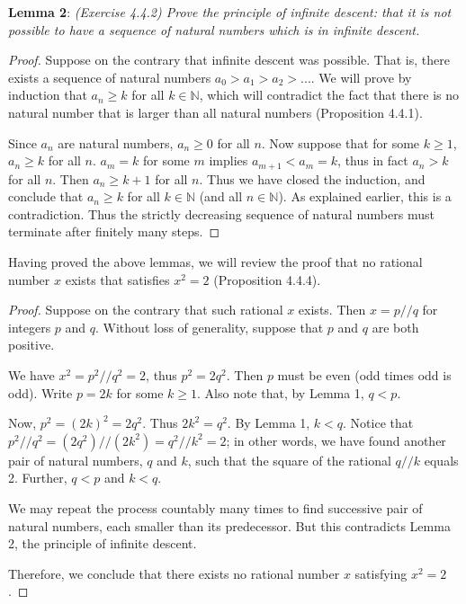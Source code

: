 \documentclass{article}
\begin{document}
\textbf{Lemma 2}: \textit{(Exercise 4.4.2) Prove the principle of infinite descent: that it is not possible to have a sequence of natural numbers which is in infinite descent. }
\begin{proof}
Suppose on the contrary that infinite descent was possible. That is, there exists a sequence of natural numbers $a_0 > a_1 > a_2 > ...$. We will prove by induction that $a_n \geq k$ for all $k \in \mathbb{N}$, which will contradict the fact that there is no natural number that is larger than all natural numbers (Proposition 4.4.1).

Since $a_n$ are natural numbers, $a_n \geq 0$ for all $n$. Now suppose that for some $k \geq 1$, $a_n \geq k$ for all $n$. $a_m = k$ for some $m$ implies $a_{m+1} < a_m = k$, thus in fact $a_n > k$ for all $n$. Then $a_n \geq k + 1$ for all $n$. Thus we have closed the induction, and conclude that $a_n \geq k$ for all $k \in \mathbb{N}$ (and all $n \in \mathbb{N}$). As explained earlier, this is a contradiction. Thus the strictly decreasing sequence of natural numbers must terminate after finitely many steps.
\end{proof}

Having proved the above lemmas, we will review the proof that no rational number $x$ exists that satisfies $x^2 = 2$ (Proposition 4.4.4).

\begin{proof}
Suppose on the contrary that such rational $x$ exists. Then $x = p // q$ for integers $p$ and $q$. Without loss of generality, suppose that $p$ and $q$ are both positive.

We have $x^2 = p^2 // q^2 = 2$, thus $p^2 = 2q^2$. Then $p$ must be even (odd times odd is odd). Write $p = 2k$ for some $k \geq 1$. Also note that, by Lemma 1, $q < p$.

Now, $p^2 = (2k)^2 = 2q^2$. Thus $2k^2 = q^2$. By Lemma 1, $k < q$. Notice that $p^2 // q^2 = (2q^2) // (2k^2) = q^2 // k^2 = 2$; in other words, we have found another pair of natural numbers, $q$ and $k$, such that the square of the rational $q//k$ equals 2. Further, $q < p$ and $k < q$.

We may repeat the process countably many times to find successive pair of natural numbers, each smaller than its predecessor. But this contradicts Lemma 2, the principle of infinite descent. 

Therefore, we conclude that there exists no rational number $x$ satisfying $x^2 = 2$.
\end{proof}
\end{document}
